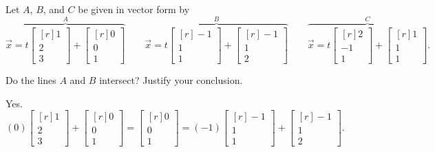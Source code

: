 \documentclass{problemset}
\newcommand{\mat}[1]{\begin{bmatrix*}[r]#1\end{bmatrix*}}
\begin{document}
	\question
	Let $A$, $B$, and $C$ be given in vector form by 
	\[
	\overbrace{\vec x=t\mat{1\\2\\3}+\mat{0\\0\\1}}^{\displaystyle A}
	\qquad \overbrace{\vec x=t\mat{-1\\1\\1}+\mat{-1\\1\\2}}^{\displaystyle B}
	\qquad \overbrace{\vec x=t\mat{2\\-1\\1}+\mat{1\\1\\1}}^{\displaystyle C}.
	\]
	\begin{parts}
		\item Do the lines $A$ and $B$ intersect? Justify your conclusion.
			\begin{solution}
				Yes. $(0)\mat{1\\2\\3}+\mat{0\\0\\1} = \mat{0\\0\\1} = (-1)\mat{-1\\1\\1}+\mat{-1\\1\\2}$.


\end{solution}
\end{parts}
\end{document}
